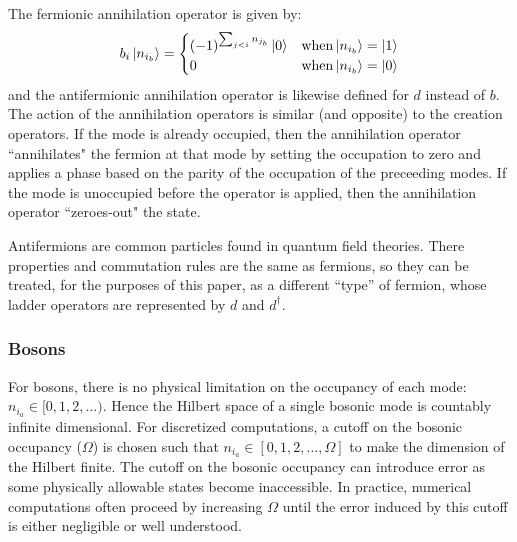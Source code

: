 The fermionic annihilation operator is given by:
\begin{equation}
    \label{eq:fermionic-annihilation}
    b_i \ket{n_{i_b}} = 
    \begin{cases} 
        (-1)^{\sum_{j < i} n_{j_b}} \ket{0}  & {\rm when} \ket{n_{i_b}} = \ket{1} \\
        0 & {\rm when} \ket{n_{i_b}} = \ket{0}
    \end{cases}
\end{equation}
and the antifermionic annihilation operator is likewise defined for $d$ instead of $b$.
The action of the annihilation operators is similar (and opposite) to the creation operators.
If the mode is already occupied, then the annihilation operator ``annihilates" the fermion at that mode by setting the occupation to zero and applies a phase based on the parity of the occupation of the preceeding modes.
If the mode is unoccupied before the operator is applied, then the annihilation operator ``zeroes-out" the state.

Antifermions are common particles found in quantum field theories.
There properties and commutation rules are the same as fermions, so they can be treated, for the purposes of this paper, as a different ``type'' of fermion, whose ladder operators are represented by $d$ and $d^\dagger$.

\subsubsection{Bosons}

For bosons, there is no physical limitation on the occupancy of each mode: $n_{i_a} \in [0, 1, 2, \dots)$.
Hence the Hilbert space of a single bosonic mode is countably infinite dimensional. 
For discretized computations, a cutoff on the bosonic occupancy ($\Omega$) is chosen such that $n_{i_a} \in [0, 1, 2, \dots, \Omega]$ to make the dimension of the Hilbert finite.
The cutoff on the bosonic occupancy can introduce error as some physically allowable states become inaccessible.
In practice, numerical computations often proceed by increasing $\Omega$ until the error induced by this cutoff is either negligible or well understood.

